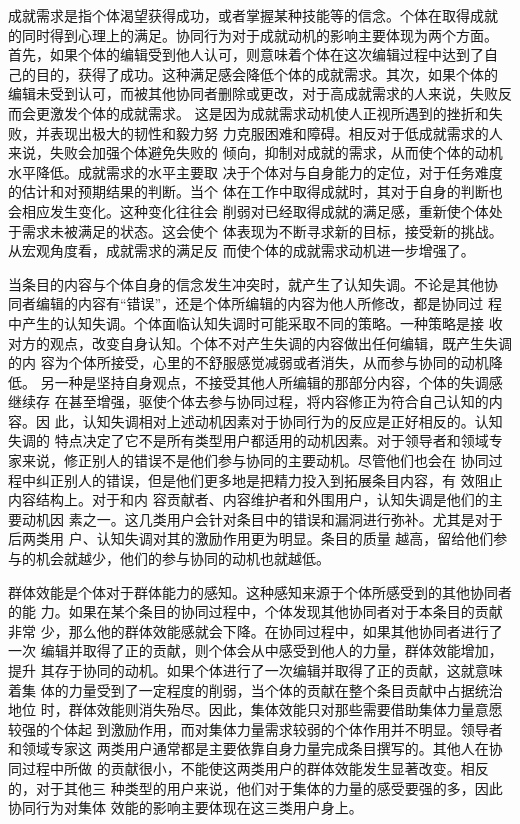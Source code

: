 成就需求是指个体渴望获得成功，或者掌握某种技能等的信念。个体在取得成就
的同时得到心理上的满足。协同行为对于成就动机的影响主要体现为两个方面。
首先，如果个体的编辑受到他人认可，则意味着个体在这次编辑过程中达到了自
己的目的，获得了成功。这种满足感会降低个体的成就需求。其次，如果个体的
编辑未受到认可，而被其他协同者删除或更改，对于高成就需求的人来说，失败反而会更激发个体的成就需求。
这是因为成就需求动机使人正视所遇到的挫折和失败，并表现出极大的韧性和毅力努
力克服困难和障碍。相反对于低成就需求的人来说，失败会加强个体避免失败的
倾向，抑制对成就的需求，从而使个体的动机水平降低。成就需求的水平主要取
决于个体对与自身能力的定位，对于任务难度的估计和对预期结果的判断。当个
体在工作中取得成就时，其对于自身的判断也会相应发生变化。这种变化往往会
削弱对已经取得成就的满足感，重新使个体处于需求未被满足的状态。这会使个
体表现为不断寻求新的目标，接受新的挑战。从宏观角度看，成就需求的满足反
而使个体的成就需求动机进一步增强了。

当条目的内容与个体自身的信念发生冲突时，就产生了认知失调。不论是其他协
同者编辑的内容有“错误”，还是个体所编辑的内容为他人所修改，都是协同过
程中产生的认知失调。个体面临认知失调时可能采取不同的策略。一种策略是接
收对方的观点，改变自身认知。个体不对产生失调的内容做出任何编辑，既产生失调的内
容为个体所接受，心里的不舒服感觉减弱或者消失，从而参与协同的动机降低。
另一种是坚持自身观点，不接受其他人所编辑的那部分内容，个体的失调感继续存
在甚至增强，驱使个体去参与协同过程，将内容修正为符合自己认知的内容。因
此，认知失调相对上述动机因素对于协同行为的反应是正好相反的。认知失调的
特点决定了它不是所有类型用户都适用的动机因素。对于领导者和领域专家来说，修正别人的错误不是他们参与协同的主要动机。尽管他们也会在
协同过程中纠正别人的错误，但是他们更多地是把精力投入到拓展条目内容，有
效阻止内容结构上。对于和内
容贡献者、内容维护者和外围用户，认知失调是他们的主要动机因
素之一。这几类用户会针对条目中的错误和漏洞进行弥补。尤其是对于后两类用
户、认知失调对其的激励作用更为明显。条目的质量
越高，留给他们参与的机会就越少，他们的参与协同的动机也就越低。

群体效能是个体对于群体能力的感知。这种感知来源于个体所感受到的其他协同者的能
力。如果在某个条目的协同过程中，个体发现其他协同者对于本条目的贡献非常
少，那么他的群体效能感就会下降。在协同过程中，如果其他协同者进行了一次
编辑并取得了正的贡献，则个体会从中感受到他人的力量，群体效能增加，提升
其存于协同的动机。如果个体进行了一次编辑并取得了正的贡献，这就意味着集
体的力量受到了一定程度的削弱，当个体的贡献在整个条目贡献中占据统治地位
时，群体效能则消失殆尽。因此，集体效能只对那些需要借助集体力量意愿较强的个体起
到激励作用，而对集体力量需求较弱的个体作用并不明显。领导者和领域专家这
两类用户通常都是主要依靠自身力量完成条目撰写的。其他人在协同过程中所做
的贡献很小，不能使这两类用户的群体效能发生显著改变。相反的，对于其他三
种类型的用户来说，他们对于集体的力量的感受要强的多，因此协同行为对集体
效能的影响主要体现在这三类用户身上。

